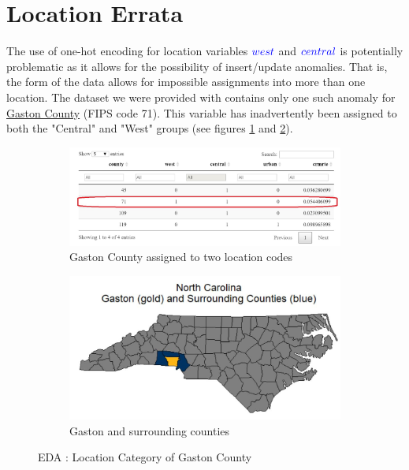 \pagebreak

\section{Location Errata}

The use of one-hot encoding for location variables $\textcolor{Blue}{west}$ and $\textcolor{Blue}{central}$ is potentially problematic as it allows for the possibility of insert/update anomalies. That is, the form of the data allows for impossible assignments into more than one location.  The dataset we were provided with contains only one such anomaly for \href{http://www.gastongov.com/}{Gaston County} (FIPS code 71).  This variable has inadvertently been assigned to both the "Central" and "West" groups (see figures \ref{fig:EDA Location - Gaston County} and \ref{fig:EDA Location map - Gaston County}).\\

\begin{figure}[!ht]
	\begin{subfigure}[b]{0.5\textwidth}
		\centering
		\includegraphics[width=\linewidth]{images/EDA_location_incorrect_category.jpg}
		\caption{Gaston County assigned to two location codes}
		\label{fig:EDA Location - Gaston County}
	\end{subfigure}
	\hfill
	\begin{subfigure}[b]{0.5\textwidth}
		\centering
		\includegraphics[width=\linewidth]{images/EDA_location_map.jpg}
		\caption{Gaston and surrounding counties}
		\label{fig:EDA Location map - Gaston County}
	\end{subfigure}
	\caption{EDA : Location Category of Gaston County}
	\label{fig:Local Errata}
\end{figure}

